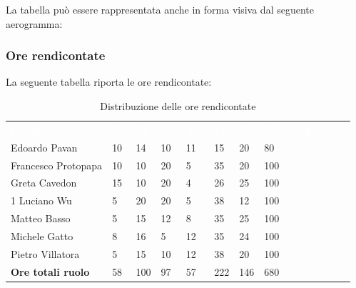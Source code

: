 La tabella può essere rappresentata anche in forma visiva dal seguente aerogramma:

\pagebreak

\subsubsection{Ore rendicontate}
La seguente tabella riporta le ore rendicontate: 
\begin{table}[H]
\begin{center}
\renewcommand{\arraystretch}{1.25}
\begin{tabular}{ m{}<{\centering}  m{}<{\centering} m{}<{\centering} m{}<{\centering}  m{}<{\centering}  m{}<{\centering}  m{}<{\centering}  m{}<{\centering}   }
	\rowcolor{darkblue}
	\textcolor{white}{\textbf{Componente}} &\textcolor{white}{\textbf{Re}}&\textcolor{white}{\textbf{Pt}}&\textcolor{white}{\textbf{An}}&\textcolor{white}{\textbf{Am}}&\textcolor{white}{\textbf{Pr}}&\textcolor{white}{\textbf{Ve}}&\textcolor{white}{\textbf{Ore complessive}}\\ 
	Edoardo Pavan & 10 & 14 & 10 & 11 & 15 & 20 & 80 \\	
	
	Francesco Protopapa & 10 & 10 & 20 & 5 & 35 & 20 & 100 \\

	Greta Cavedon & 15 & 10 & 20 & 4 & 26 & 25 & 100 \\
	1
	Luciano Wu & 5 & 20 & 20 & 5 & 38 & 12 & 100 \\
	
	Matteo Basso & 5 & 15 & 12 & 8 & 35 & 25 & 100 \\
	
	Michele Gatto & 8 & 16 & 5 & 12 & 35 & 24 & 100 \\
	
	Pietro Villatora & 5 & 15 & 10 & 12 & 38 & 20 & 100 \\
	
	\textbf{Ore totali ruolo} & 58 & 100 & 97 & 57 & 222 & 146 & 680 \\

\end{tabular}
\caption{Distribuzione delle ore rendicontate}
\end{center}
\end{table}

